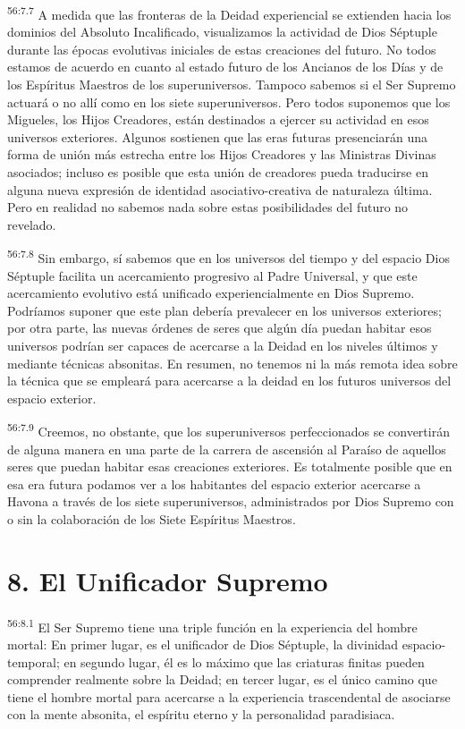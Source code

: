 \par
\textsuperscript{56:7.7} A medida que las fronteras de la Deidad experiencial se extienden hacia los dominios del Absoluto Incalificado, visualizamos la actividad de Dios Séptuple durante las épocas evolutivas iniciales de estas creaciones del futuro. No todos estamos de acuerdo en cuanto al estado futuro de los Ancianos de los Días y de los Espíritus Maestros de los superuniversos. Tampoco sabemos si el Ser Supremo actuará o no allí como en los siete superuniversos. Pero todos suponemos que los Migueles, los Hijos Creadores, están destinados a ejercer su actividad en esos universos exteriores. Algunos sostienen que las eras futuras presenciarán una forma de unión más estrecha entre los Hijos Creadores y las Ministras Divinas asociados; incluso es posible que esta unión de creadores pueda traducirse en alguna nueva expresión de identidad asociativo-creativa de naturaleza última. Pero en realidad no sabemos nada sobre estas posibilidades del futuro no revelado.

\par
\textsuperscript{56:7.8} Sin embargo, sí sabemos que en los universos del tiempo y del espacio Dios Séptuple facilita un acercamiento progresivo al Padre Universal, y que este acercamiento evolutivo está unificado experiencialmente en Dios Supremo. Podríamos suponer que este plan debería prevalecer en los universos exteriores; por otra parte, las nuevas órdenes de seres que algún día puedan habitar esos universos podrían ser capaces de acercarse a la Deidad en los niveles últimos y mediante técnicas absonitas. En resumen, no tenemos ni la más remota idea sobre la técnica que se empleará para acercarse a la deidad en los futuros universos del espacio exterior.

\par
\textsuperscript{56:7.9} Creemos, no obstante, que los superuniversos perfeccionados se convertirán de alguna manera en una parte de la carrera de ascensión al Paraíso de aquellos seres que puedan habitar esas creaciones exteriores. Es totalmente posible que en esa era futura podamos ver a los habitantes del espacio exterior acercarse a Havona a través de los siete superuniversos, administrados por Dios Supremo con o sin la colaboración de los Siete Espíritus Maestros.

\section*{8. El Unificador Supremo}
\par
\textsuperscript{56:8.1} El Ser Supremo tiene una triple función en la experiencia del hombre mortal: En primer lugar, es el unificador de Dios Séptuple, la divinidad espacio-temporal; en segundo lugar, él es lo máximo que las criaturas finitas pueden comprender realmente sobre la Deidad; en tercer lugar, es el único camino que tiene el hombre mortal para acercarse a la experiencia trascendental de asociarse con la mente absonita, el espíritu eterno y la personalidad paradisiaca.

